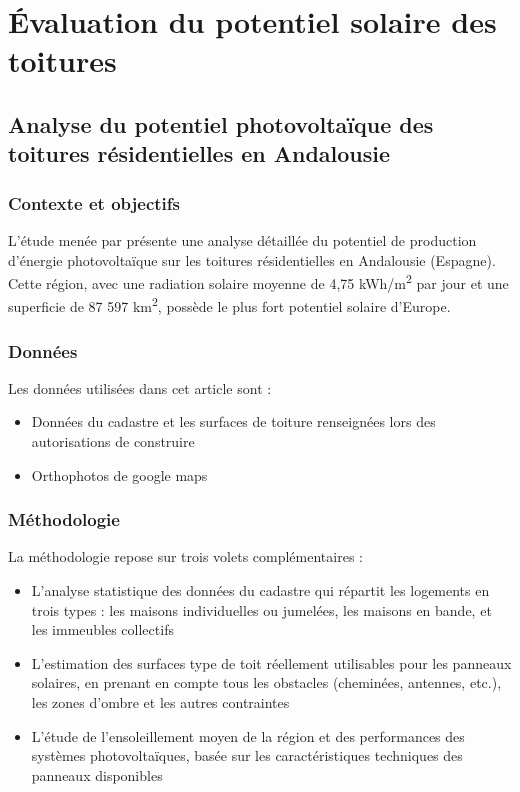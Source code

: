 \section{Évaluation du potentiel solaire des toitures}

\subsection{Analyse du potentiel photovoltaïque des toitures résidentielles en Andalousie}

\subsubsection{Contexte et objectifs}
\par{L'étude menée par \citeauthor{ordonez_analysis_2010} \cite{ordonez_analysis_2010} présente une analyse détaillée du potentiel de production d'énergie photovoltaïque sur les toitures résidentielles en Andalousie (Espagne). Cette région, avec une radiation solaire moyenne de 4,75 \si{\unit{kWh/m^2}} par jour et une superficie de 87 597 \si{\unit{km^2}}, possède le plus fort potentiel solaire d'Europe.}

\subsubsection{Données}
\par{Les données utilisées dans cet article sont :}
\begin{itemize}
    \item Données du cadastre et les surfaces de toiture renseignées lors des autorisations de construire
    \item Orthophotos de google maps
\end{itemize}

\subsubsection{Méthodologie}
\par{La méthodologie repose sur trois volets complémentaires :}
\begin{itemize}
    \item L'analyse statistique des données du cadastre qui répartit les logements en trois types : les maisons individuelles ou jumelées, les maisons en bande, et les immeubles collectifs
    \item L'estimation des surfaces type de toit réellement utilisables pour les panneaux solaires, en prenant en compte tous les obstacles (cheminées, antennes, etc.), les zones d'ombre et les autres contraintes
    \item L'étude de l'ensoleillement moyen de la région et des performances des systèmes photovoltaïques, basée sur les caractéristiques techniques des panneaux disponibles
\end{itemize}

